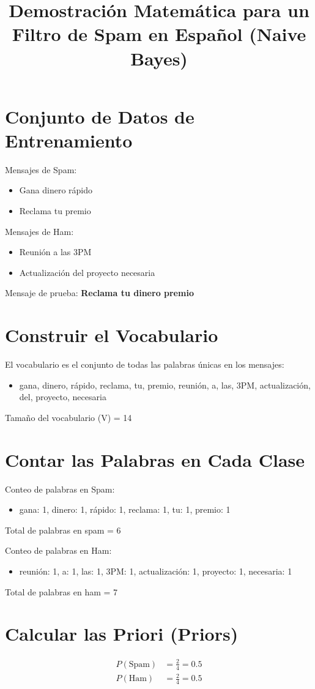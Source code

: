 \documentclass{article}
\title{Demostración Matemática para un Filtro de Spam en Español (Naive Bayes)}
\author{}
\date{}
\begin{document}
\maketitle

\section{Conjunto de Datos de Entrenamiento}
Mensajes de Spam:
\begin{itemize}
    \item Gana dinero rápido
    \item Reclama tu premio
\end{itemize}
Mensajes de Ham:
\begin{itemize}
    \item Reunión a las 3PM
    \item Actualización del proyecto necesaria
\end{itemize}

Mensaje de prueba: \textbf{Reclama tu dinero premio}

\section{Construir el Vocabulario}
El vocabulario es el conjunto de todas las palabras únicas en los mensajes:
\begin{itemize}
    \item gana, dinero, rápido, reclama, tu, premio, reunión, a, las, 3PM, actualización, del, proyecto, necesaria
\end{itemize}
Tamaño del vocabulario (V) = 14

\section{Contar las Palabras en Cada Clase}
Conteo de palabras en Spam:
\begin{itemize}
    \item gana: 1, dinero: 1, rápido: 1, reclama: 1, tu: 1, premio: 1
\end{itemize}
Total de palabras en spam = 6

Conteo de palabras en Ham:
\begin{itemize}
    \item reunión: 1, a: 1, las: 1, 3PM: 1, actualización: 1, proyecto: 1, necesaria: 1
\end{itemize}
Total de palabras en ham = 7

\section{Calcular las Priori (Priors)}
\begin{align*}
P(\text{Spam}) &= \frac{2}{4} = 0.5 \\
P(\text{Ham}) &= \frac{2}{4} = 0.5
\end{align*}
\end{document}
